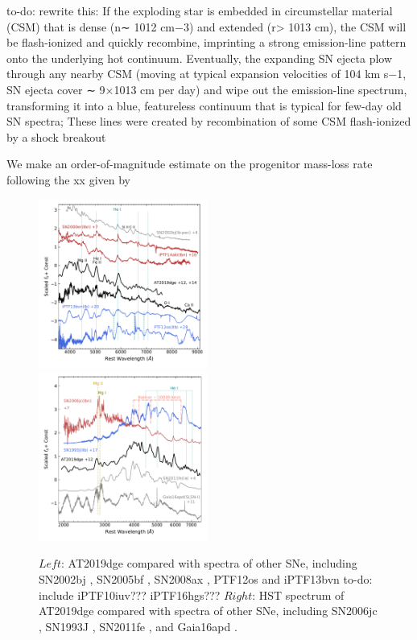 \documentclass[twocolumn]{aastex63}
\newcommand{\todo}[1]{{\color{magenta} to-do: {#1}}}
\begin{document}
\begin{CJK*}{UTF8}{gbsn}
\todo{rewrite this: If the exploding star is embedded in circumstellar material (CSM) that is dense (n∼ 
1012 cm−3) and extended (r> 1013 cm), the CSM will be flash-ionized and quickly recombine, imprinting 
a strong emission-line pattern onto the underlying hot continuum. Eventually, the expanding SN ejecta 
plow through any nearby CSM (moving at typical expansion velocities of 104 km s−1, SN ejecta cover ∼ 
9×1013 cm per day) and wipe out the emission-line spectrum, transforming it into a blue, featureless 
continuum that is typical for few-day old SN spectra;}
These lines were created by recombination of some CSM flash-ionized by a shock breakout 
\citep{Khazov2016}

We make an order-of-magnitude estimate on the progenitor mass-loss rate following the xx given by 
\citet{Ofek2013}


\begin{figure}[htbp!]
	\centering
	\includegraphics[width=0.495\textwidth]{figures/hst_opt.pdf}
	\includegraphics[width=0.495\textwidth]{figures/hst_all.pdf}
	\caption{$Left$: AT2019dge compared with spectra of 
	other SNe, 
	including SN2002bj \citep{Poznanski2010}, SN2005bf \citep{Folatelli2006}, SN2008ax 
	\citep{Chornock2011}, PTF12os and iPTF13bvn \citep{Fremling2016} \todo{include iPTF10iuv??? 
	iPTF16hgs??? }
	$Right$: HST spectrum of AT2019dge compared with spectra of other SNe, including SN2006jc 
	\citep{Bufano2009}, SN1993J \citep{Jeffery1994}, SN2011fe \citep{Mazzali2014}, and Gaia16apd 
	\citep{Yan2017}.
		\label{fig:hst}}
\end{figure}

\end{CJK*}
\end{document}
